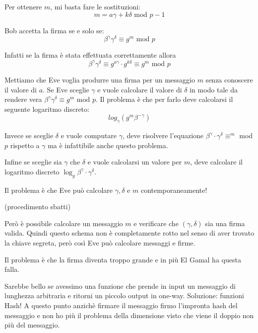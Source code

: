 Per ottenere $m$, mi basta fare le sostituzioni:
\begin{equation*}
	m = a\gamma + k\delta \text{ mod } p-1
\end{equation*}

Bob accetta la firma se e solo se:
\begin{equation*}
	\beta^\gamma \gamma^\delta \equiv g^m \text{ mod } p
\end{equation*}

Infatti se la firma è stata effettuata correttamente allora
\begin{equation*}
	\beta^\gamma \gamma^\delta \equiv g^{a \gamma} \cdot g^{k\delta} \equiv g^m \text{ mod } p
\end{equation*}

Mettiamo che Eve voglia produrre una firma per un messaggio $m$ senza conoscere il valore di $a$. Se Eve sceglie $\gamma$ e vuole calcolare il valore di $\delta$ in modo tale da rendere vera $\beta^\gamma \gamma^\delta \equiv g^m \text{ mod } p$. Il problema è che per farlo deve calcolarsi il seguente logaritmo discreto:
\begin{equation*}
	log_{\gamma}(g^m \beta^{-\gamma})
\end{equation*}

Invece se sceglie $\delta$ e vuole computare $\gamma$, deve risolvere l'equazione $\beta^{\gamma} \cdot \gamma^{\delta} \equiv ^m$ mod $p$ rispetto a $\gamma$ ma è infattibile anche questo problema.

Infine se sceglie sia $\gamma$ che $\delta$ e vuole calcolarsi un valore per $m$, deve calcolare il logaritmo discreto $\log_g\beta^{\gamma} \cdot \gamma^\delta$.

Il problema è che Eve può calcolare $\gamma, \delta$ e $m$ contemporaneamente!

(procedimento sbatti)

Però è possibile calcolare un messaggio $m$ e verificare che $(\gamma, \delta)$ sia una firma valida.
Quindi questo schema non è completamente rotto nel senso di aver trovato la chiave segreta, però così Eve può calcolare messaggi e firme.

Il problema è che la firma diventa troppo grande e in più El Gamal ha questa falla.

Sarebbe bello se avessimo una funzione che prende in input un messaggio di lunghezza arbitraria e ritorni un piccolo output in one-way.
Soluzione: funzioni Hash!
A questo punto anzichè firmare il messaggio firmo l'impronta hash del messaggio e non ho più il problema della dimensione visto che viene il doppio non più del messaggio.\\

